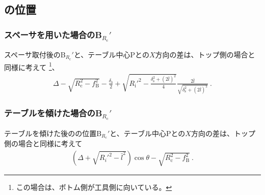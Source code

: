 \clearpage


\subsection{\BottomCurvatureCenter の位置}

\subsubsection{スペーサを用いた場合のB\texorpdfstring{$_{R_\mathrm c}'$}{Rc'}}
スペーサ取付後の\BottomCurvatureCenter B$_{R_\mathrm c}'$と、テーブル中心Pとの$X$方向の差は、トップ側の場合と同様に考えて
\footnote{この場合は、ボトム側が工具側に向いている。}、
\begin{align*}
  \Delta-\sqrt{R_\mathrm c^2-f_\mathrm B^2}-\frac{\delta_\mathrm s}2
  +\sqrt{R_\mathrm i'^2-\frac{\delta_\mathrm s^2+(2\bar l)^2}4}\frac{2\bar l}{\sqrt{\delta_\mathrm s^2+(2\bar l)^2}}\ .
\end{align*}

\subsubsection{テーブルを傾けた場合のB\texorpdfstring{$_{R_\mathrm c}'$}{Rc'}}
テーブルを傾けた後の\BottomCurvatureCenter の位置B$_{R_\mathrm c}'$と、テーブル中心Pとの$X$方向の差は、トップ側の場合と同様に考えて
\begin{align*}
  \left(\Delta+\sqrt{R_i'^2-\bar l^2}\right)\cos\theta-\sqrt{R_\mathrm c^2-f_\mathrm B^2}~.
\end{align*}


